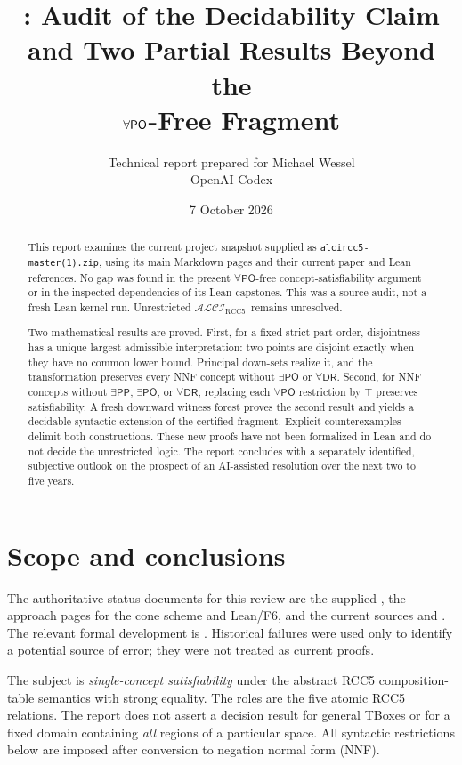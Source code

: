 \documentclass[11pt,letterpaper]{article}
\title{\vspace{-1.2em}\textbf{\logic: Audit of the Decidability Claim\\[3pt]
and Two Partial Results Beyond the\\[3pt]
\texorpdfstring{$\forall\PO$}{forall-PO}-Free Fragment}}
\author{Technical report prepared for Michael Wessel\\
\small OpenAI Codex}
\date{7 October 2026}
\newcommand{\logic}{\ensuremath{\mathcal{ALCI}_{\mathrm{RCC5}}}}
\newcommand{\PP}{\mathsf{PP}}
\newcommand{\PO}{\mathsf{PO}}
\newcommand{\DR}{\mathsf{DR}}
\theoremstyle{definition}
\theoremstyle{remark}
\begin{document}
\maketitle
\thispagestyle{empty}
\begin{abstract}
This report examines the current project snapshot supplied as
\texttt{alcircc5-master(1).zip}, using its main Markdown pages and their
current paper and Lean references. No gap was found in the present
$\forall\PO$-free concept-satisfiability argument or in the inspected
dependencies of its Lean capstones. This was a source audit, not a fresh Lean
kernel run. Unrestricted \logic\ remains unresolved.

Two mathematical results are proved. First, for a fixed strict part order,
disjointness has a unique largest admissible interpretation: two points are
disjoint exactly when they have no common lower bound. Principal down-sets
realize it, and the transformation preserves every NNF concept without
$\exists\PO$ or $\forall\DR$. Second, for NNF concepts without
$\exists\PP$, $\exists\PO$, or $\forall\DR$, replacing each
$\forall\PO$ restriction by $\top$ preserves satisfiability. A fresh
downward witness forest proves the second result and yields a decidable
syntactic extension of the certified fragment. Explicit counterexamples
delimit both constructions. These new proofs have not been formalized in Lean
and do not decide the unrestricted logic.
The report concludes with a separately identified, subjective outlook on
the prospect of an AI-assisted resolution over the next two to five years.
\end{abstract}

\section{Scope and conclusions}
\label{sec:scope}

The authoritative status documents for this review are the supplied
, the approach pages for the cone scheme and Lean/F6, and
the current sources  and
. The relevant formal development is
. Historical failures were used only to
identify a potential source of error; they were not treated as current proofs.

The subject is \emph{single-concept satisfiability} under the abstract RCC5
composition-table semantics with strong equality. The roles are the five
atomic RCC5 relations. The report does not assert a decision result for
general TBoxes or for a fixed domain containing \emph{all} regions of a
particular space. All syntactic restrictions below are imposed after
conversion to negation normal form (NNF).
\end{document}
